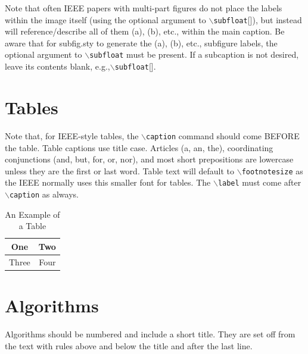 \documentclass[lettersize,journal]{IEEEtran}
\begin{document}
Note that often IEEE papers with multi-part figures do not place the labels within the image itself (using the optional argument to $\backslash${\tt{subfloat}}[]), but instead will
 reference/describe all of them (a), (b), etc., within the main caption.
 Be aware that for subfig.sty to generate the (a), (b), etc., subfigure
 labels, the optional argument to $\backslash${\tt{subfloat}} must be present. If a
 subcaption is not desired, leave its contents blank,
 e.g.,$\backslash${\tt{subfloat}}[].


 

\section{Tables}
Note that, for IEEE-style tables, the
 $\backslash${\tt{caption}} command should come BEFORE the table. Table captions use title case. Articles (a, an, the), coordinating conjunctions (and, but, for, or, nor), and most short prepositions are lowercase unless they are the first or last word. Table text will default to $\backslash${\tt{footnotesize}} as
 the IEEE normally uses this smaller font for tables.
 The $\backslash${\tt{label}} must come after $\backslash${\tt{caption}} as always.
 
\begin{table}[!t]
\caption{An Example of a Table\label{tab:table1}}
\centering
\begin{tabular}{|c||c|}
\hline
One & Two\\
\hline
Three & Four\\
\hline
\end{tabular}
\end{table}

\section{Algorithms}
Algorithms should be numbered and include a short title. They are set off from the text with rules above and below the title and after the last line.
\end{document}
